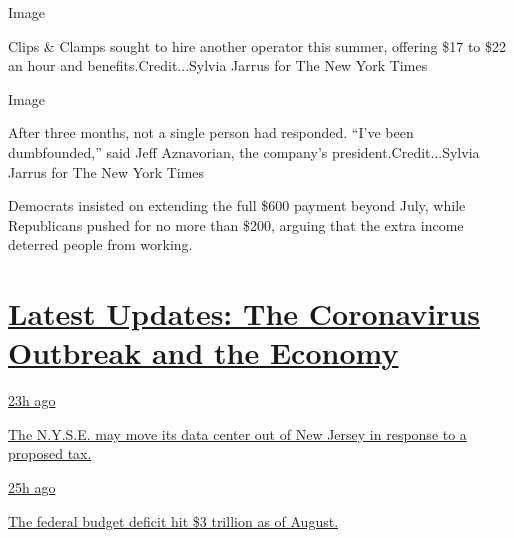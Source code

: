 Image

Clips \& Clamps sought to hire another operator this summer, offering
\$17 to \$22 an hour and benefits.Credit...Sylvia Jarrus for The New
York Times

Image

After three months, not a single person had responded. ``I've been
dumbfounded,'' said Jeff Aznavorian, the company's
president.Credit...Sylvia Jarrus for The New York Times

Democrats insisted on extending the full \$600 payment beyond July,
while Republicans pushed for no more than \$200, arguing that the extra
income deterred people from working.

\hypertarget{latest-updates-the-coronavirus-outbreak-and-the-economy}{%
\section{\texorpdfstring{\href{https://www.nytimes3xbfgragh.onion/live/2020/09/11/business/stock-market-today-coronavirus?action=click\&pgtype=Article\&state=default\&region=MAIN_CONTENT_1\&context=storylines_live_updates}{Latest
Updates: The Coronavirus Outbreak and the
Economy}}{Latest Updates: The Coronavirus Outbreak and the Economy}}\label{latest-updates-the-coronavirus-outbreak-and-the-economy}}

\href{https://www.nytimes3xbfgragh.onion/live/2020/09/11/business/stock-market-today-coronavirus?action=click\&pgtype=Article\&state=default\&region=MAIN_CONTENT_1\&context=storylines_live_updates\#the-nyse-may-move-its-data-center-out-of-new-jersey-in-response-to-a-proposed-tax}{23h
ago}

\href{https://www.nytimes3xbfgragh.onion/live/2020/09/11/business/stock-market-today-coronavirus?action=click\&pgtype=Article\&state=default\&region=MAIN_CONTENT_1\&context=storylines_live_updates\#the-nyse-may-move-its-data-center-out-of-new-jersey-in-response-to-a-proposed-tax}{The
N.Y.S.E. may move its data center out of New Jersey in response to a
proposed tax.}

\href{https://www.nytimes3xbfgragh.onion/live/2020/09/11/business/stock-market-today-coronavirus?action=click\&pgtype=Article\&state=default\&region=MAIN_CONTENT_1\&context=storylines_live_updates\#the-federal-budget-deficit-hit-3-trillion-as-of-august}{25h
ago}

\href{https://www.nytimes3xbfgragh.onion/live/2020/09/11/business/stock-market-today-coronavirus?action=click\&pgtype=Article\&state=default\&region=MAIN_CONTENT_1\&context=storylines_live_updates\#the-federal-budget-deficit-hit-3-trillion-as-of-august}{The
federal budget deficit hit \$3 trillion as of August.}

